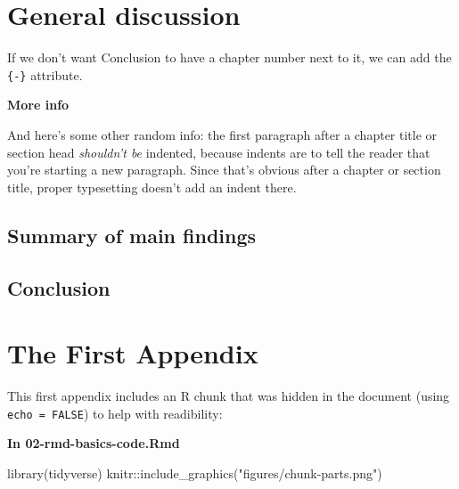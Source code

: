 \documentclass[a4paper, twoside]{templates/ociamthesis}
\newenvironment{Shaded}{\begin{snugshade}}{\end{snugshade}}
\newcommand{\FunctionTok}[1]{\textcolor[rgb]{0.00,0.00,0.00}{#1}}
\newcommand{\NormalTok}[1]{#1}
\newcommand{\SpecialCharTok}[1]{\textcolor[rgb]{0.00,0.00,0.00}{#1}}
\newcommand{\StringTok}[1]{\textcolor[rgb]{0.31,0.60,0.02}{#1}}
\renewenvironment{Shaded}
{
  \vspace{4pt}%
  \begin{snugshade}%
}{%
  \end{snugshade}%
  \vspace{4pt}%
}
\begin{document}
\hypertarget{general-discussion}{%
\chapter*{General discussion}\label{general-discussion}}

If we don't want Conclusion to have a chapter number next to it, we can add the \texttt{\{-\}} attribute.

\textbf{More info}

And here's some other random info: the first paragraph after a chapter title or section head \emph{shouldn't be} indented, because indents are to tell the reader that you're starting a new paragraph. Since that's obvious after a chapter or section title, proper typesetting doesn't add an indent there.

\hypertarget{summary-of-main-findings}{%
\section*{Summary of main findings}\label{summary-of-main-findings}}

\hypertarget{conclusion-3}{%
\section*{Conclusion}\label{conclusion-3}}

\startappendices

\hypertarget{the-first-appendix}{%
\chapter{The First Appendix}\label{the-first-appendix}}

This first appendix includes an R chunk that was hidden in the document (using \texttt{echo\ =\ FALSE}) to help with readibility:

\textbf{In 02-rmd-basics-code.Rmd}

\begin{Shaded}
\begin{Highlighting}[]
\FunctionTok{library}\NormalTok{(tidyverse)}
\NormalTok{knitr}\SpecialCharTok{::}\FunctionTok{include\_graphics}\NormalTok{(}\StringTok{"figures/chunk{-}parts.png"}\NormalTok{)}
\end{Highlighting}
\end{Shaded}
\end{document}
